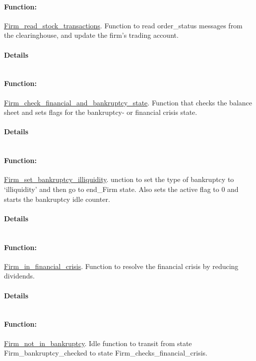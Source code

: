 \documentclass[a4paper,11pt]{article}
\begin{document}
\paragraph{Function:}\url{Firm_read_stock_transactions}.
Function to read order\_status messages from the clearinghouse, and update the firm's trading account.
\paragraph{Details}
\begin{verbatim}
\end{verbatim}
\paragraph{Function:}\url{Firm_check_financial_and_bankruptcy_state}.
Function that checks the balance sheet and sets flags for the bankruptcy- or financial crisis state.
\paragraph{Details}
\begin{verbatim}
\end{verbatim}
\paragraph{Function:}\url{Firm_set_bankruptcy_illiquidity}.
unction to set the type of bankruptcy to `illiquidity' and then go to end\_Firm state. 
Also sets the active flag to 0 and starts the bankruptcy idle counter.
\paragraph{Details}
\begin{verbatim}
\end{verbatim}
\paragraph{Function:}\url{Firm_in_financial_crisis}.
Function to resolve the financial crisis by reducing dividends.
\paragraph{Details}
\begin{verbatim}
\end{verbatim}
\paragraph{Function:}\url{Firm_not_in_bankruptcy}.
Idle function to transit from state Firm\_bankruptcy\_checked to state Firm\_checks\_financial\_crisis.
\end{document}
